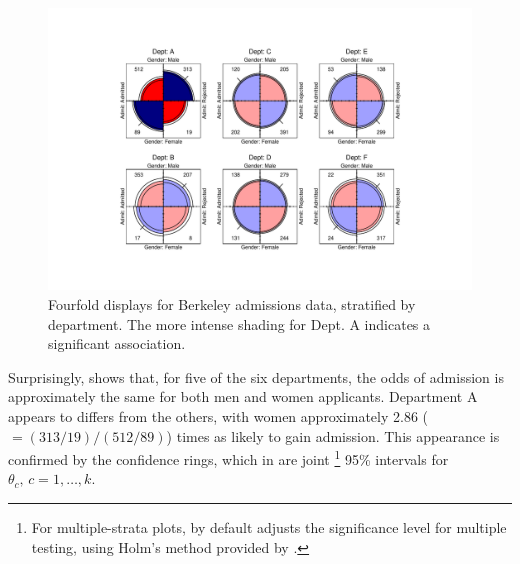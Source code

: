 \documentclass[11pt]{book}
\renewenvironment{knitrout}{\small\renewcommand{\baselinestretch}{.85}}{} %
\begin{document}
\begin{knitrout}
\color{fgcolor}\begin{kframe}
\begin{alltt}
 \hlkwb{<-}  \hlstd{(}\hlstd{,} \hlstd{,} \hlstd{))}
\hlstd{=}\hlstd{(}\hlstd{,}\hlstd{))}
\end{alltt}
\end{kframe}\begin{figure}[!htbp]


\centerline{\includegraphics[width=.95\textwidth,trim=80 50 80 50]{ch04/fig/berk-fourfold4} }

\caption[Fourfold displays for Berkeley admissions data, stratified by department]{Fourfold displays for Berkeley admissions data, stratified by department. The more intense shading for Dept. A indicates a significant association.\label{fig:berk-fourfold4}}
\end{figure}


\end{knitrout}

Surprisingly,  shows that, for five of the
six departments, the odds of admission is approximately the same for
both men and women applicants.  Department A appears to differs from
the others, with women approximately 2.86 (\(=  ( 313/19 )  /
(512/89)\)) times as likely to gain admission.  This appearance is
confirmed by the confidence rings, which in 
are joint%
\footnote{
For multiple-strata plots,  by default adjusts the
significance level for multiple testing, using Holm's 
\citeyearpar{Holm:1979} method
provided by .
}
95\% intervals for \(\theta_c ,  \,  c = 1, \dots ,
k\).
\end{document}
